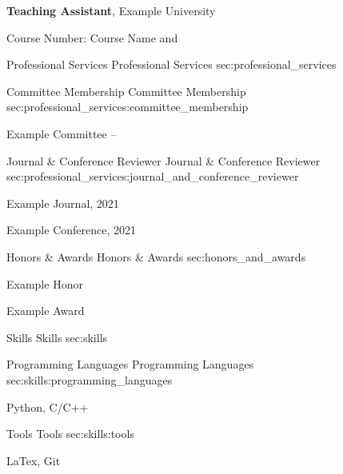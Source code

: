 \documentclass[letterpaper,mmyyyy]{cvacademique}
\begin{document}
\begin{Body}
\textbf{Teaching Assistant}, Example University

\BulletItem
{Course Number: Course Name}
{ and }



\Section
{Professional Services}
{Professional Services}
{sec:professional_services}


\Subsection
{Committee Membership}
{Committee Membership}
{sec:professional_services:committee_membership}

\BulletItem
{Example Committee}
{ -- \DatestampP}


\Subsection
{Journal \& Conference Reviewer}
{Journal \& Conference Reviewer}
{sec:professional_services:journal_and_conference_reviewer}

\BulletItem
{Example Journal, 2021}

\BulletItem
{Example Conference, 2021}



\Section
{Honors \& Awards}
{Honors \& Awards}
{sec:honors_and_awards}

\BulletItem
{Example Honor}
{}

\BulletItem
{Example Award}
{}


\Section
{Skills}
{Skills}
{sec:skills}


\Subsection
{Programming Languages}
{Programming Languages}
{sec:skills:programming_languages}

Python, C/C++


\Subsection
{Tools}
{Tools}
{sec:skills:tools}

LaTex, Git

\end{Body}


\CompileNote
\end{document}
